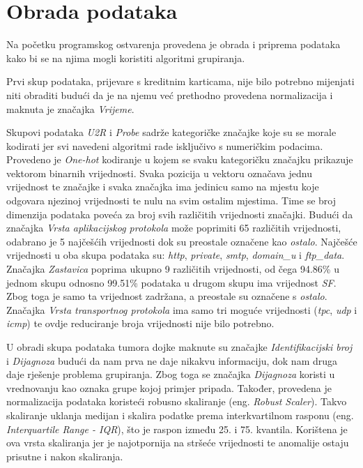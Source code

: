 \documentclass[utf8, diplomski, numeric]{fer}
\begin{document}
\section{Obrada podataka}
Na početku programskog ostvarenja provedena je obrada i priprema podataka kako bi se na njima mogli koristiti algoritmi grupiranja.

Prvi skup podataka, prijevare s kreditnim karticama, nije bilo potrebno mijenjati niti obraditi budući da je na njemu već prethodno provedena normalizacija i maknuta je značajka \textit{Vrijeme}. 

Skupovi podataka \textit{U2R} i \textit{Probe} sadrže kategoričke značajke koje su se morale kodirati jer svi navedeni algoritmi rade isključivo s numeričkim podacima. Provedeno je \textit{One-hot} kodiranje u kojem se svaku kategoričku značajku prikazuje vektorom binarnih vrijednosti. Svaka pozicija u vektoru označava jednu vrijednost te značajke i svaka značajka ima jedinicu samo na mjestu koje odgovara njezinoj vrijednosti te nulu na svim ostalim mjestima. Time se broj dimenzija podataka poveća za broj svih različitih vrijednosti značajki. Budući da značajka \textit{Vrsta aplikacijskog protokola} može poprimiti 65 različitih vrijednosti, odabrano je 5 najčešćih vrijednosti dok su preostale označene kao \textit{ostalo}. Najčešće vrijednosti u oba skupa podataka su: \textit{http}, \textit{private},  \textit{smtp}, \textit{domain\_u}  i \textit{ftp\_data}. Značajka \textit{Zastavica} poprima ukupno 9 različitih vrijednosti, od čega 94.86\% u jednom skupu odnosno 99.51\% podataka u drugom skupu ima vrijednost \textit{SF}. Zbog toga je samo ta vrijednost zadržana, a preostale su označene s \textit{ostalo}. Značajka \textit{Vrsta transportnog protokola} ima samo tri moguće vrijednosti (\textit{tpc}, \textit{udp} i \textit{icmp}) te ovdje reduciranje broja vrijednosti nije bilo potrebno.

U obradi skupa podataka tumora dojke maknute su značajke  \textit{Identifikacijski broj} i \textit{Dijagnoza} budući da nam prva ne daje nikakvu informaciju, dok nam druga daje rješenje problema grupiranja. Zbog toga se značajka \textit{Dijagnoza} koristi u vrednovanju kao oznaka grupe kojoj primjer pripada. Također, provedena je normalizacija podataka koristeći robusno skaliranje (eng. \textit{Robust Scaler}). Takvo skaliranje uklanja medijan i skalira podatke prema interkvartilnom rasponu (eng. \textit{Interquartile Range - IQR}), što je raspon između 25. i 75. kvantila. Korištena je ova vrsta skaliranja jer je najotpornija na stršeće vrijednosti te anomalije ostaju prisutne i nakon skaliranja.
\end{document}
